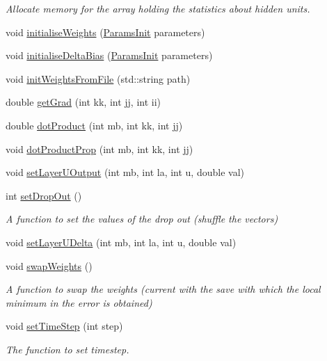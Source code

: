 \begin{DoxyCompactItemize}
\begin{DoxyCompactList}\small\item\em Allocate memory for the array holding the statistics about hidden units. \end{DoxyCompactList}\item 
void \hyperlink{classNeuralNetwork_a36525085d71d9aa8d755e5e19ebae7cc}{initialise\+Weights} (\hyperlink{classParamsInit}{Params\+Init} parameters)
\item 
void \hyperlink{classNeuralNetwork_ae8bd77cbaa88df5152db8a745254141c}{initialise\+Delta\+Bias} (\hyperlink{classParamsInit}{Params\+Init} parameters)
\item 
void \hyperlink{classNeuralNetwork_a77e3c1107530a1cb28021c7c2864c81f}{init\+Weights\+From\+File} (std\+::string path)
\item 
double \hyperlink{classNeuralNetwork_af0c6f4203d6c3b823a575954102bdf5d}{get\+Grad} (int kk, int jj, int ii)
\item 
double \hyperlink{classNeuralNetwork_adca7f84b7b063acebef819bae1abbaf7}{dot\+Product} (int mb, int kk, int jj)
\item 
void \hyperlink{classNeuralNetwork_af8a0997a14c97e1fb6ef97d3c132f808}{dot\+Product\+Prop} (int mb, int kk, int jj)
\item 
void \hyperlink{classNeuralNetwork_ad5d0e3d069c7ce2fbde30161771ba507}{set\+Layer\+U\+Output} (int mb, int la, int u, double val)
\item 
int \hyperlink{classNeuralNetwork_a1d0b90f44982811b3e28e3b9a4dfa810}{set\+Drop\+Out} ()
\begin{DoxyCompactList}\small\item\em A function to set the values of the drop out (shuffle the vectors) \end{DoxyCompactList}\item 
void \hyperlink{classNeuralNetwork_a2a84fe4a996154130853f031c6e475aa}{set\+Layer\+U\+Delta} (int mb, int la, int u, double val)
\item 
void \hyperlink{classNeuralNetwork_aeccccbe1b61dec7e4e76bd55bad7e591}{swap\+Weights} ()
\begin{DoxyCompactList}\small\item\em A function to swap the weights (current with the save with which the local minimum in the error is obtained) \end{DoxyCompactList}\item 
void \hyperlink{classNeuralNetwork_ad70d1e2802185f0126f0c52ac2dc55f1}{set\+Time\+Step} (int step)
\begin{DoxyCompactList}\small\item\em The function to set timestep. \end{DoxyCompactList}\item 

\end{DoxyCompactItemize}
